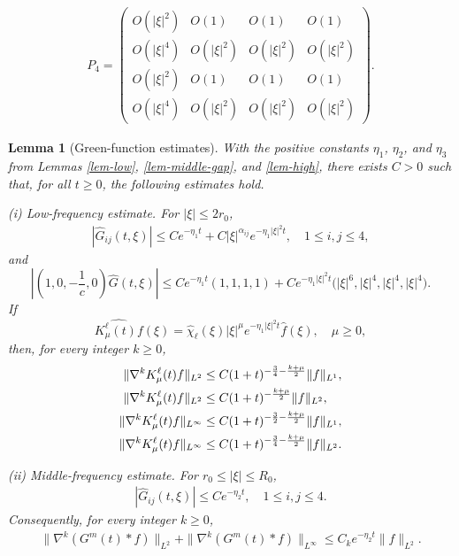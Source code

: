 \documentclass[10pt,a4paper]{amsart}
\newtheorem{lem}{Lemma}
\begin{document}
\begin{align}\label{low-P4}
P_4=
\begin{pmatrix}
O(|\xi|^2)&O(1)&O(1)&O(1)\\
O(|\xi|^4)&O(|\xi|^2)&O(|\xi|^2)&O(|\xi|^2)\\
O(|\xi|^2)&O(1)&O(1)&O(1)\\
O(|\xi|^4)&O(|\xi|^2)&O(|\xi|^2)&O(|\xi|^2)
\end{pmatrix}.
\end{align}

\begin{lem}[Green-function estimates]\label{lem-green-estimates}
 With the positive constants $\eta_1$, $\eta_2$, and $\eta_3$ from Lemmas \ref{lem-low}, \ref{lem-middle-gap}, and \ref{lem-high}, there exists $C>0$ such that, for all $t\ge0$, the following estimates hold.

\smallskip
\noindent\emph{(i) Low-frequency estimate.} For $|\xi|\le2r_0$,
\begin{align}\label{low-G-pointwise}
|\widehat G_{ij}(t,\xi)|
\le Ce^{-\eta_1  t}+C|\xi|^{\alpha_{ij}}e^{-\eta_1 |\xi|^2t},
\quad 1\le i,j\le4,
\end{align}
and
\[%
\left|\left(1,0,-\frac1c,0\right)\widehat G(t,\xi)\right| \le Ce^{-\eta_1  t}(1,1,1,1) +Ce^{-\eta_1 |\xi|^2t} \big(|\xi|^6,|\xi|^4,|\xi|^4,|\xi|^4\big).
\]%
If
\[
\widehat{K_\mu^\ell(t)f}(\xi)
=\widehat\chi_\ell(\xi)|\xi|^\mu e^{-\eta_1 |\xi|^2t}\widehat f(\xi),
\quad \mu\ge0,
\]
then, for every integer $k\ge0$,
\begin{align}%
\|\nabla^kK_\mu^\ell(t)f\|_{L^2}
&\le C(1+t)^{-\frac34-\frac{k+\mu}{2}}\|f\|_{L^1}, \notag \\
\|\nabla^kK_\mu^\ell(t)f\|_{L^2}
&\le C(1+t)^{-\frac{k+\mu}{2}}\|f\|_{L^2},  \notag \\
\label{low-kernel-L1inf}
\|\nabla^kK_\mu^\ell(t)f\|_{L^\infty}
&\le C(1+t)^{-\frac32-\frac{k+\mu}{2}}\|f\|_{L^1},\\
\label{low-kernel-L2inf}
\|\nabla^kK_\mu^\ell(t)f\|_{L^\infty}
&\le C(1+t)^{-\frac34-\frac{k+\mu}{2}}\|f\|_{L^2}.
\end{align}

\smallskip
\noindent\emph{(ii) Middle-frequency estimate.} For $r_0\le|\xi|\le R_0$,
\begin{align}\label{middle-decay}
|\widehat G_{ij}(t,\xi)|\le Ce^{-\eta_2   t},
\quad 1\le i,j\le4.
\end{align}
Consequently, for every integer $k\ge0$,
\begin{align}\label{middle-G-operator}
\|\nabla^k(G^m(t)*f)\|_{L^2}
+\|\nabla^k(G^m(t)*f)\|_{L^\infty}
\le C_k e^{-\eta_2   t}\|f\|_{L^2}.
\end{align}


\end{lem}
\end{document}
